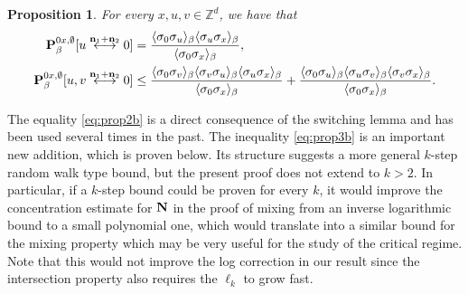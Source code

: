 \documentclass[a4paper,oneside,11pt]{article}
\def\Z{\mathbb{Z}}                          %
\newtheorem{proposition}[theorem]{Proposition}
\numberwithin{equation}{section}
\numberwithin{equation}{section}
\numberwithin{equation}{section}
\def\Z{\mathbb{Z}}                          %
\newcommand{\n}{\mathbf{n}}
\begin{document}
\begin{proposition}\label{prop:3}
For every $x,u,v\in \Z^d$, we have that
\begin{align}\label{eq:prop2b}
{\bf P}^{0x,\emptyset}_\beta[u\stackrel{\n_1+\n_2}\longleftrightarrow 0]&=\frac{\langle\sigma_0\sigma_u\rangle_\beta\langle\sigma_u\sigma_x\rangle_\beta}{\langle\sigma_0\sigma_x\rangle_\beta},\\
\label{eq:prop3b}{\bf P}^{0x,\emptyset}_\beta[u,v\stackrel{\n_1+\n_2}\longleftrightarrow0]&\le \frac{\langle\sigma_0\sigma_v\rangle_\beta\langle\sigma_v\sigma_u\rangle_\beta\langle\sigma_u\sigma_x\rangle_\beta}{\langle\sigma_0\sigma_x\rangle_\beta}+\frac{\langle\sigma_0\sigma_u\rangle_\beta\langle\sigma_u\sigma_v\rangle_\beta\langle\sigma_v\sigma_x\rangle_\beta}{\langle\sigma_0\sigma_x\rangle_\beta}.\end{align}
\end{proposition}
The equality  \eqref{eq:prop2b} is a direct consequence of the switching lemma and has been used several times in the past.  The inequality \eqref{eq:prop3b} is an important new addition, which is proven below.  Its structure  suggests a more general $k$-step random walk type bound, but the present proof does not extend to $k>2$. In particular, if a $k$-step bound could be proven for every $k$, it would improve the concentration estimate for ${\bf N}$ in the proof of mixing from an inverse logarithmic bound to a small polynomial one, which would translate into a similar bound for the mixing property which may be very useful for the study of the critical regime. Note that this would not improve the log correction in our result since the intersection property also requires the $\ell_k$ to grow fast.
\end{document}
